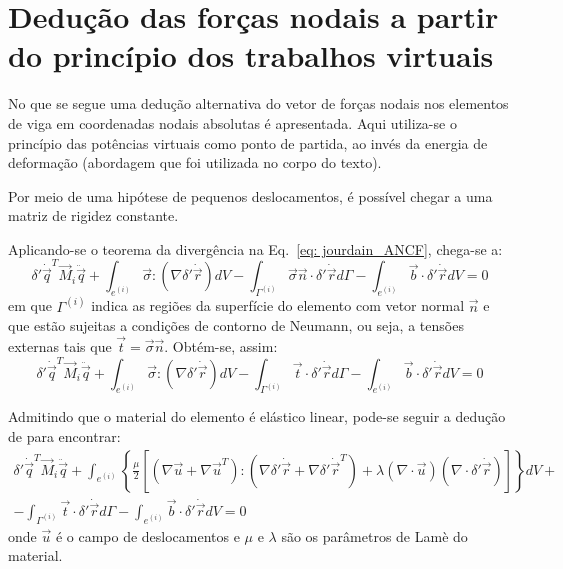  \chapter{Dedução das forças nodais a partir do princípio dos trabalhos virtuais}
No que se segue uma dedução alternativa do vetor de forças nodais nos elementos de viga
em coordenadas nodais absolutas é apresentada. Aqui utiliza-se o princípio das potências
virtuais como ponto de partida, ao invés da energia de deformação (abordagem que foi utilizada
no corpo do texto).

Por meio de uma hipótese de pequenos deslocamentos, é possível chegar a uma matriz de rigidez
constante.

Aplicando-se o teorema da divergência na Eq.~\eqref{eq: jourdain_ANCF}, chega-se a:
\begin{equation}
    \delta'\dot{\vec{q}}^T \vec{M}_i \ddot{\vec{q}} + 
    \int_{e^{(i)}}{\vec{\sigma}:\left(\nabla{\delta'\dot{\vec{r}}}\right) dV} 
    - \int_{\Gamma^{(i)}}{\vec{\sigma}\vec{n} \cdot \delta'\dot{\vec{r}} d\Gamma} - \int_{e^{(i)}}{\vec{b}\cdot \delta'\dot{\vec{r}} dV} = 0
\end{equation}
em que $\Gamma^{(i)}$ indica as regiões da superfície do elemento com vetor normal $\vec{n}$ e que estão 
sujeitas a condições de contorno de 
Neumann, ou seja, a tensões externas tais que $\vec{t}=\vec{\sigma}\vec{n}$. Obtém-se, assim:
\begin{equation}
    \delta'\dot{\vec{q}}^T \vec{M}_i \ddot{\vec{q}} + 
    \int_{e^{(i)}}{\vec{\sigma}:\left(\nabla{\delta'\dot{\vec{r}}}\right) dV} 
    - \int_{\Gamma^{(i)}}{\vec{t} \cdot \delta'\dot{\vec{r}} d\Gamma} - \int_{e^{(i)}}{\vec{b}\cdot \delta'\dot{\vec{r}} dV} = 0
\end{equation}

Admitindo que o material do elemento é elástico linear, pode-se seguir a dedução de 
para encontrar:
\begin{equation}
\begin{split}
     \delta'\dot{\vec{q}}^T \vec{M}_i \ddot{\vec{q}} + 
    \int_{e^{(i)}}{\left\{ \frac{\mu}{2} \left[ 
        \left( \nabla{\vec{u}} + \nabla{\vec{u}}^T \right) : \left( \nabla{\delta'\dot{\vec{r}}} + \nabla{\delta'\dot{\vec{r}}}^T \right)
        + \lambda \left(\nabla{}\cdot\vec{u}\right) \left(\nabla{}\cdot\delta'\dot{\vec{r}}\right)
    \right] \right\} dV} +\\
    - \int_{\Gamma^{(i)}}{\vec{t} \cdot \delta'\dot{\vec{r}} d\Gamma} 
    - \int_{e^{(i)}}{\vec{b}\cdot \delta'\dot{\vec{r}} dV} = 0
\end{split} \label{eq: eq_mov_1}
\end{equation}
onde $\vec{u}$ é o campo de deslocamentos e $\mu$ e $\lambda$ são os parâmetros de Lamè do material.


